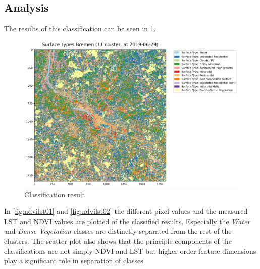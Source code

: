 \documentclass[12pt,a4paper, english,twoside]{scrartcl}
\begin{document}
    \subsection{Analysis}\label{sec:landcoverAnalysis} 
      The results of this classification can be seen in \cref{fig:classification}. 
      \begin{figure}[!htbp]
       \begin{center}
         \includegraphics[width=\textwidth]{img/Classification.png}
       \end{center}
       \caption{Classification result}\label{fig:classification}
      \end{figure}
      In \cref{fig:ndvilst01} and \cref{fig:ndvilst02} the different pixel values and the measured LST and NDVI values are plotted of the classified results. 
      Especially the \textit{Water} and \textit{Dense Vegetation} classes are distinctly separated from the rest of the clusters. 
      The scatter plot also shows that the principle components of the classifications are not simply \gls{NDVI} and \gls{LST} but higher order feature dimensions play a significant role in separation of classes. 
\end{document}
